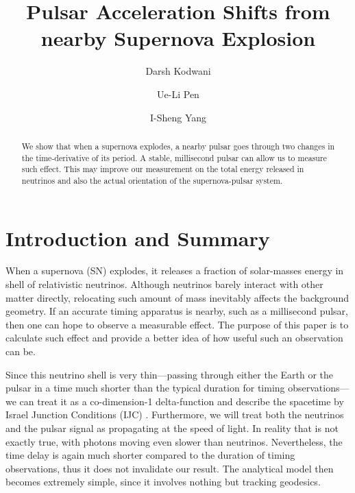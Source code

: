 \documentclass[aps,showpacs,twocolumn,floats,prd,superscriptaddress,nofootinbib]{revtex4-1}
\begin{document}
\title{Pulsar Acceleration Shifts from nearby Supernova Explosion}

\author{Darsh Kodwani}

\author{Ue-Li Pen}

\author{I-Sheng Yang}

\begin{abstract}
We show that when a supernova explodes, a nearby pulsar goes through two changes in the time-derivative of its period. A stable, millisecond pulsar can allow us to measure such effect. This may improve our measurement on the total energy released in neutrinos and also the actual orientation of the supernova-pulsar system.
\end{abstract}

\maketitle

\section{Introduction and Summary}

When a supernova (SN) explodes, it releases a fraction of solar-masses energy in shell of relativistic neutrinos. Although neutrinos barely interact with other matter directly, relocating such amount of mass inevitably affects the background geometry. If an accurate timing apparatus is nearby, such as a millisecond pulsar, then one can hope to observe a measurable effect. The purpose of this paper is to calculate such effect and provide a better idea of how useful such an observation can be.

Since this neutrino shell is very thin---passing through either the Earth or the pulsar in a time much shorter than the typical duration for timing observations---we can treat it as a co-dimension-1 delta-function and describe the spacetime by Israel Junction Conditions (IJC) \cite{Isr66}. Furthermore, we will treat both the neutrinos and the pulsar signal as propagating at the speed of light. In reality that is not exactly true, with photons moving even slower than neutrinos. Nevertheless, the time delay is again much shorter compared to the duration of timing observations, thus it does not invalidate our result. The analytical model then becomes extremely simple, since it involves nothing but tracking geodesics\cite{BouFre07,JohYan10}.
\end{document}
